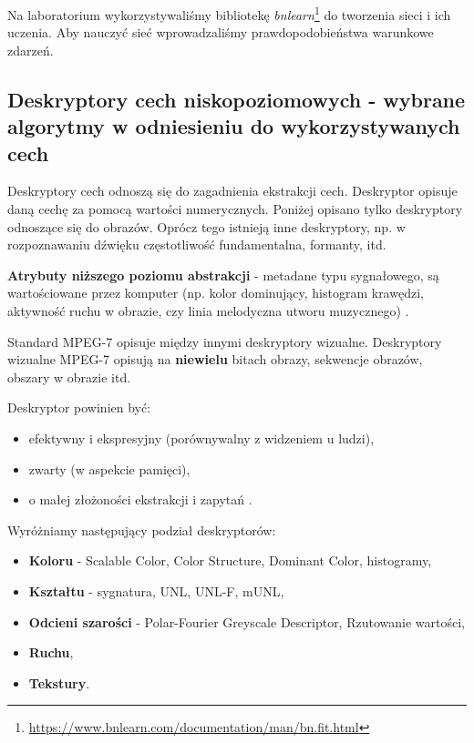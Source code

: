 \documentclass[wi]{zut}
\begin{document}
Na laboratorium wykorzystywaliśmy bibliotekę \emph{bnlearn}\footnote{\url{https://www.bnlearn.com/documentation/man/bn.fit.html}} do tworzenia sieci i ich uczenia. Aby nauczyć sieć wprowadzaliśmy prawdopodobieństwa warunkowe zdarzeń.
\question

\subsection{Deskryptory cech niskopoziomowych - wybrane algorytmy w odniesieniu do wykorzystywanych cech}

Deskryptory cech odnoszą się do zagadnienia ekstrakcji cech. Deskryptor opisuje daną cechę za pomocą wartości numerycznych. Poniżej opisano tylko deskryptory odnoszące się do obrazów. Oprócz tego istnieją inne deskryptory, np. w rozpoznawaniu dźwięku częstotliwość fundamentalna, formanty, itd.

\textbf{Atrybuty niższego poziomu abstrakcji} - metadane typu sygnałowego, są wartościowane przez komputer (np. kolor dominujący, histogram krawędzi, aktywność ruchu w obrazie, czy linia melodyczna utworu muzycznego) \cite{Frejlichowski2020}.

Standard MPEG-7 opisuje między innymi deskryptory wizualne. Deskryptory wizualne MPEG-7 opisują na \textbf{niewielu} bitach obrazy, sekwencje obrazów, obszary w obrazie itd. 

Deskryptor powinien być:

\begin{itemize}
    \item efektywny i ekspresyjny (porównywalny z widzeniem u ludzi),
    \item zwarty (w aspekcie pamięci),
    \item o małej złożoności ekstrakcji i zapytań \cite{Frejlichowski2020}.
\end{itemize}

Wyróżniamy następujący podział deskryptorów:

\begin{itemize}
    \item \textbf{Koloru} - Scalable Color, Color Structure, Dominant Color, histogramy,
    \item \textbf{Kształtu} - sygnatura, UNL, UNL-F, mUNL,
    \item \textbf{Odcieni szarości} - Polar-Fourier Greyscale Descriptor, Rzutowanie wartości,
    \item \textbf{Ruchu},
    \item \textbf{Tekstury}.
\end{itemize}
\end{document}

